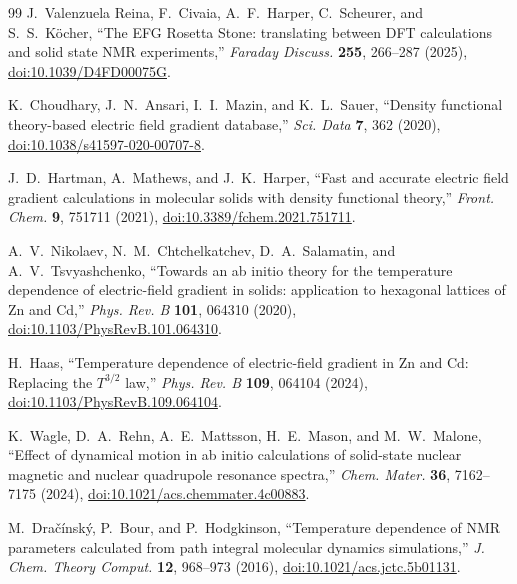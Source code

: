 \documentclass[10pt]{article}
\begin{document}
\begin{thebibliography}{99}
J.~Valenzuela Reina, F.~Civaia, A.~F.~Harper, C.~Scheurer, and S.~S.~Köcher,
``The EFG Rosetta Stone: translating between DFT calculations and solid state NMR experiments,''
\emph{Faraday Discuss.} \textbf{255}, 266--287 (2025),
\href{https://doi.org/10.1039/D4FD00075G}{doi:10.1039/D4FD00075G}.

K.~Choudhary, J.~N.~Ansari, I.~I.~Mazin, and K.~L.~Sauer,
``Density functional theory-based electric field gradient database,''
\emph{Sci. Data} \textbf{7}, 362 (2020),
\href{https://doi.org/10.1038/s41597-020-00707-8}{doi:10.1038/s41597-020-00707-8}.

J.~D.~Hartman, A.~Mathews, and J.~K.~Harper,
``Fast and accurate electric field gradient calculations in molecular solids with density functional theory,''
\emph{Front. Chem.} \textbf{9}, 751711 (2021),
\href{https://doi.org/10.3389/fchem.2021.751711}{doi:10.3389/fchem.2021.751711}.

A.~V.~Nikolaev, N.~M.~Chtchelkatchev, D.~A.~Salamatin, and A.~V.~Tsvyashchenko,
``Towards an ab initio theory for the temperature dependence of electric-field gradient in solids: application to hexagonal lattices of Zn and Cd,''
\emph{Phys. Rev. B} \textbf{101}, 064310 (2020),
\href{https://doi.org/10.1103/PhysRevB.101.064310}{doi:10.1103/PhysRevB.101.064310}.

H.~Haas,
``Temperature dependence of electric-field gradient in Zn and Cd: Replacing the $T^{3/2}$ law,''
\emph{Phys. Rev. B} \textbf{109}, 064104 (2024),
\href{https://doi.org/10.1103/PhysRevB.109.064104}{doi:10.1103/PhysRevB.109.064104}.

K.~Wagle, D.~A.~Rehn, A.~E.~Mattsson, H.~E.~Mason, and M.~W.~Malone,
``Effect of dynamical motion in ab initio calculations of solid-state nuclear magnetic and nuclear quadrupole resonance spectra,''
\emph{Chem. Mater.} \textbf{36}, 7162--7175 (2024),
\href{https://doi.org/10.1021/acs.chemmater.4c00883}{doi:10.1021/acs.chemmater.4c00883}.

M.~Dračínský, P.~Bour, and P.~Hodgkinson,
``Temperature dependence of NMR parameters calculated from path integral molecular dynamics simulations,''
\emph{J. Chem. Theory Comput.} \textbf{12}, 968--973 (2016),
\href{https://doi.org/10.1021/acs.jctc.5b01131}{doi:10.1021/acs.jctc.5b01131}.

\end{thebibliography}
\end{document}
